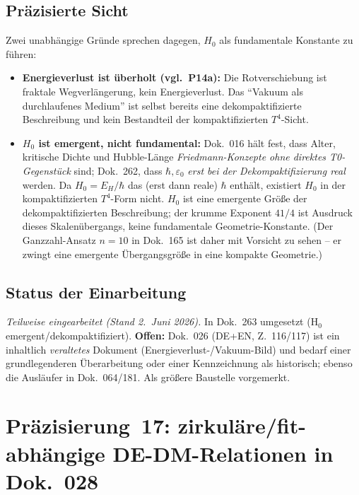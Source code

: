 \subsection*{Präzisierte Sicht}

Zwei unabhängige Gründe sprechen dagegen, $H_0$ als fundamentale Konstante zu
führen:
\begin{itemize}
  \item \textbf{Energieverlust ist überholt (vgl.\ P14a):} Die
        Rotverschiebung ist fraktale Wegverlängerung, kein Energieverlust. Das
        \enquote{Vakuum als durchlaufenes Medium} ist selbst bereits eine
        dekompaktifizierte Beschreibung und kein Bestandteil der
        kompaktifizierten $T^4$-Sicht.
  \item \textbf{$H_0$ ist emergent, nicht fundamental:} Dok.~016 hält fest,
        dass Alter, kritische Dichte und Hubble-Länge \emph{Friedmann-Konzepte
        ohne direktes T0-Gegenstück} sind; Dok.~262, dass $\hbar, \varepsilon_0$
        \emph{erst bei der Dekompaktifizierung real} werden. Da $H_0 = E_H/\hbar$
        das (erst dann reale) $\hbar$ enthält, existiert $H_0$ in der
        kompaktifizierten $T^4$-Form nicht. $H_0$ ist eine emergente Größe der
        dekompaktifizierten Beschreibung; der krumme Exponent $41/4$ ist
        Ausdruck dieses Skalenübergangs, keine fundamentale Geometrie-Konstante.
        (Der Ganzzahl-Ansatz $n=10$ in Dok.~165 ist daher mit Vorsicht zu sehen
        -- er zwingt eine emergente Übergangsgröße in eine kompakte Geometrie.)
\end{itemize}

\subsection*{Status der Einarbeitung}

\emph{Teilweise eingearbeitet (Stand 2.~Juni 2026).} In Dok.~263 umgesetzt
(H$_0$ emergent/dekompaktifiziert). \textbf{Offen:} Dok.~026 (DE+EN, Z.~116/117)
ist ein inhaltlich \emph{veraltetes} Dokument (Energieverlust-/Vakuum-Bild) und
bedarf einer grundlegenderen Überarbeitung oder einer Kennzeichnung als
historisch; ebenso die Ausläufer in Dok.~064/181. Als größere Baustelle
vorgemerkt.

\section{\texorpdfstring{Präzisierung~17: zirkuläre/fit-abhängige DE-DM-Relationen in Dok.~028}{Praezisierung 17: zirkulaere DE-DM-Relationen in Dok 028}}

